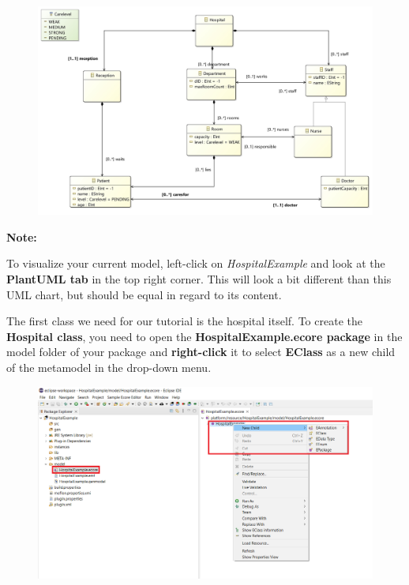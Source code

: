 \begin{figure}[h]
    \centering
    \includegraphics[scale=0.9, width= \textwidth]{pictures/model_finished.jpg}
    \caption{}
    \label{goal model}
\end{figure}

\textbf{Note:}

To visualize your current model, left-click on \textit{\textsf{HospitalExample}} and look at the \textbf{PlantUML tab} in the top right corner. This will look a bit different than this UML chart, but should be equal in regard to its content.

\clearpage

The first class we need for our tutorial is the hospital itself. To create the \textbf{Hospital class}, you need to open the \textbf{HospitalExample.ecore package} in the model folder of your package and \textbf{right-click} it to select \textbf{EClass} as a new child of the metamodel in the drop-down menu.\newline

\begin{figure}[h]
    \centering
    \includegraphics[scale=0.5, width= \textwidth]{pictures/new_child.png}
    \caption{}
    \label{project creation}
\end{figure}

